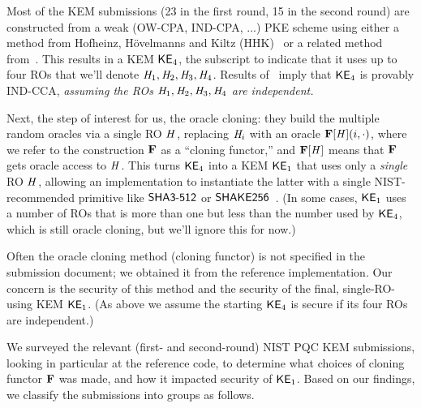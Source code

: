 Most of the KEM submissions (23 in the first round, 15 in the second round) are constructed from a weak (OW-CPA, IND-CPA, ...) PKE scheme using either a method from Hofheinz, H\"{o}velmanns and Kiltz (HHK)~\cite{TCC:HofHovKil17} or a related method from~\cite{IMA:Dent03,EC:SaiXagYam18,C:JZCWM18}. This results in a KEM ${\mathsf{KE}}_{4}$, the subscript to indicate that it uses up to four ROs that we'll denote $\mathit{H}_1, \mathit{H}_2, \mathit{H}_3, \mathit{H}_4$. Results of~\cite{TCC:HofHovKil17,IMA:Dent03,EC:SaiXagYam18,C:JZCWM18} imply that ${\mathsf{KE}}_{4}$ is provably IND-CCA, \textit{assuming the ROs $\mathit{H}_1, \mathit{H}_2, \mathit{H}_3, \mathit{H}_4$ are independent.}



Next, the step of interest for us, the oracle cloning: they build the multiple random oracles via a single RO $\mathit{H}$, replacing $\mathit{H}_i$ with an oracle $\mathbf{F}[\mathit{H}](i,\cdot)$, where we refer to the construction $\mathbf{F}$ as a ``cloning functor,'' and $\mathbf{F}[\mathit{H}]$ means that $\mathbf{F}$ gets oracle access to $\mathit{H}$. This turns ${\mathsf{KE}}_{4}$ into a KEM ${\mathsf{KE}}_{1}$ that uses only a \textit{single} RO $\mathit{H}$, allowing an implementation to instantiate the latter with a single NIST-recommended primitive like $\mathsf{SHA3}\mbox{-}\mathsf{512}$ or $\mathsf{SHAKE256}$~\cite{FIPS202}. (In some cases, ${\mathsf{KE}}_{1}$ uses a number of ROs that is more than one but less than the number used by ${\mathsf{KE}}_{4}$, which is still oracle cloning, but we'll ignore this for now.) 

Often the oracle cloning method (cloning functor) is not specified in the submission document; we obtained it from the reference implementation. Our concern is the security of this method and the security of the final, single-RO-using KEM ${\mathsf{KE}}_{1}$. (As above we assume the starting ${\mathsf{KE}}_{4}$ is secure if its four ROs are independent.)



We surveyed the relevant (first- and second-round) NIST PQC KEM submissions, looking in particular at the reference code, to determine what choices of cloning functor $\mathbf{F}$ was made, and how it impacted security of ${\mathsf{KE}}_{1}$.
 Based on our findings, we classify the submissions into groups as follows. 

